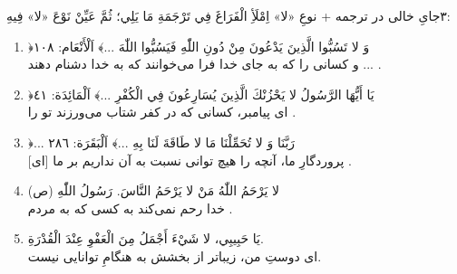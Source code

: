 \begin{JTamrin}{٣}{جایِ خالی در ترجمه + نوعِ «لا»}
اِمْلَأِ الْفَرَاغَ فِي تَرْجَمَةِ مَا يَلِي؛ ثُمَّ عَيِّنْ نَوْعَ «لا» فِيهِ:

\begin{enumerate}
  \item ﴿وَ لا تَسُبُّوا الَّذِينَ يَدْعُونَ مِنْ دُونِ اللّٰهِ فَيَسُبُّوا
        اللّٰهَ ...﴾ اَلْأَنْعَام: ١٠٨\\
        و کسانی را که به جای خدا فرا می‌خوانند \JdotsW{4cm} که به خدا دشنام
        دهند ... .
  \item ﴿يَا أَيُّهَا الرَّسُولُ لا يَحْزُنْكَ الَّذِينَ يُسَارِعُونَ
        فِي الْكُفْرِ ...﴾ اَلْمَائِدَة: ٤١\\
        ای پیامبر، کسانی که در کفر شتاب می‌ورزند تو را \JdotsW{4cm}.
  \item ﴿... رَبَّنَا وَ لا تُحَمِّلْنَا مَا لا طَاقَةَ لَنَا بِهِ
        ...﴾ اَلْبَقَرَة: ٢٨٦\\
        {[ای]} پروردگارِ ما، آنچه را هیچ توانی نسبت به آن نداریم بر ما
        \JdotsW{4cm}. 
  \item لا يَرْحَمُ اللّٰهُ مَنْ لا يَرْحَمُ النَّاسَ. رَسُولُ اللّٰهِ (ص)\\
        خدا رحم نمی‌کند به کسی که به مردم \JdotsW{4cm}.
  \item يَا حَبِيبِي، لا شَيْءَ أَجْمَلُ مِنَ الْعَفْوِ عِنْدَ الْقُدْرَةِ.\\
        ای دوستِ من، \JdotsW{3cm} زیباتر از بخشش به هنگامِ توانایی نیست.
\end{enumerate}
\end{JTamrin}

